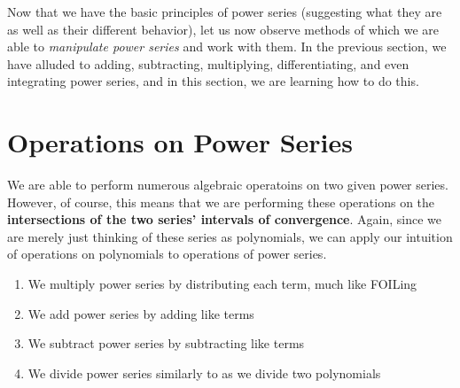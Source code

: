 Now that we have the basic principles of power series (suggesting
what they are as well as their different behavior), let us
now observe methods of which we are able to \textit{manipulate
  power series} and work with them. In the previous section,
we have alluded to adding, subtracting, multiplying, differentiating, and even integrating power series, and in this
section, we are learning how to do this.

\section{Operations on Power Series}
We are able to perform numerous algebraic operatoins
on two given power series. However, of course, this means
that we are performing these operations on the
\textbf{intersections of the two series' intervals of
  convergence}. Again, since we are merely just thinking
of these series as polynomials, we can apply
our intuition of operations on polynomials to operations
of power series.
\begin{enumerate}
  \item We multiply power series by distributing each term,
        much like FOILing
  \item We add power series by adding like terms
  \item We subtract power series by subtracting like
        terms
  \item We divide power series similarly to as
        we divide two polynomials
\end{enumerate}

\begin{center}
\end{center}

